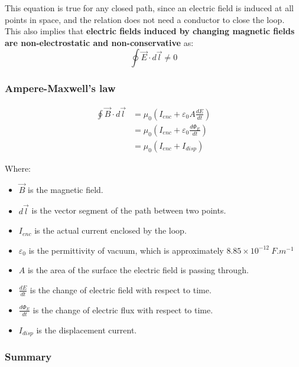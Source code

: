 \documentclass[11pt]{article}
\begin{document}
This equation is true for any closed path, since an electric field is induced at all points in space, and the relation does not need a conductor to close the loop. This also implies that \textbf{electric fields induced by changing magnetic fields are non-electrostatic and non-conservative} as:
\[\oint \vec{E} \cdot d \vec{l} \ne 0\]

\newpage
\subsubsection{Ampere-Maxwell's law}
\label{sec:org958602c}

\begin{align*}
\oint \vec{B} \cdot d \vec{l} &= \mu_0 \left(I_{enc} + \varepsilon_0 A \frac{dE}{dt} \right) \\
&= \mu_0 \left(I_{enc} + \varepsilon_0 \frac{d \Phi_E}{dt} \right) \\
&= \mu_0 (I_{enc} + I_{disp})
\end{align*}

Where:
\begin{itemize}
\item \(\vec{B}\) is the magnetic field.
\item \(d \vec{l}\) is the vector segment of the path between two points.
\item \(I_{enc}\) is the actual current enclosed by the loop.
\item \(\varepsilon_0\) is the permittivity of vacuum, which is approximately \(8.85 \times 10^{-12} \ \unit{F.m^{-1}}\)
\item \(A\) is the area of the surface the electric field is passing through.
\item \(\frac{dE}{dt}\) is the change of electric field with respect to time.
\item \(\frac{d \Phi_E}{dt}\) is the change of electric flux with respect to time.
\item \(I_{disp}\) is the displacement current.
\end{itemize}

\newpage
\subsubsection{Summary}
\label{sec:org3043f37}
\end{document}
